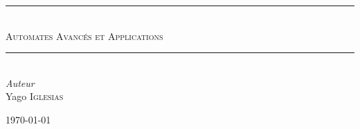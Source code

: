 \documentclass{article}
\begin{document}
\begin{titlepage}
	\newcommand{\HRule}{\rule{\linewidth}{0.5mm}}
	\center

	\HRule\\[0.4cm]

	\textsc{\Large Automates Avancés et Applications}\\[0.5cm]

	\HRule\\[1.5cm]


	{\large\textit{Auteur}}\\
	Yago \textsc{Iglesias}


	\vfill\vfill\vfill

	{\large\today}

	\vfill

\end{titlepage}

\tableofcontents


\end{document}
